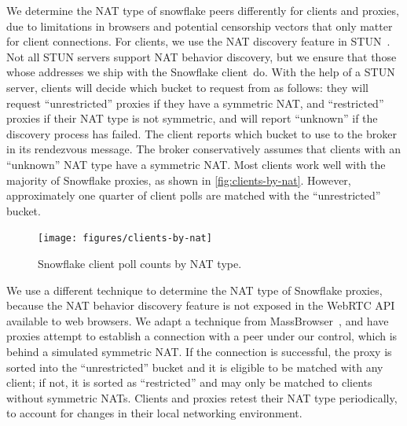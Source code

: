 \documentclass[letterpaper,twocolumn]{article}
\begin{document}
We determine the NAT type of snowflake peers differently for clients and proxies, due to
limitations in browsers and potential censorship vectors that
only matter for client connections.
For clients, we use the NAT discovery feature in STUN~\cite{rfc5780}.
Not all STUN servers support NAT behavior discovery,
but we ensure that those whose addresses we ship with the Snowflake client~do.
With the help of a STUN server,
clients will decide which bucket to request from as follows:
they will request ``unrestricted'' proxies if they have a symmetric NAT, and
``restricted'' proxies if their NAT type is not symmetric,
and will report ``unknown'' if the discovery process has failed.
The client reports which bucket to use to the broker
in its rendezvous message.
The broker conservatively assumes that clients
with an ``unknown'' NAT type have a symmetric NAT.
Most clients work well with the majority of Snowflake proxies, as
shown in \autoref{fig:clients-by-nat}.
However, approximately one quarter of client polls
are matched with the ``unrestricted'' bucket.

\begin{figure}
\centering
\texttt{[image: figures/clients-by-nat]}
\caption{Snowflake client poll counts by NAT type.}
\label{fig:clients-by-nat}
\end{figure}

We use a different technique to determine the NAT type of Snowflake proxies,
because the NAT behavior discovery feature
is not exposed in the WebRTC API available to web browsers.
We adapt a technique from MassBrowser~\cite[\S \mbox{V-A}]{Nasr2020a},
and have proxies attempt to establish a connection with a peer under our control,
which is behind a simulated symmetric NAT.
If the connection is successful,
the proxy is sorted into the ``unrestricted'' bucket
and it is eligible to be matched with any client;
if not, it is sorted as ``restricted''
and may only be matched to clients without symmetric NATs.
Clients and proxies
retest their NAT type periodically, to account for changes in their local networking
environment.
\end{document}

